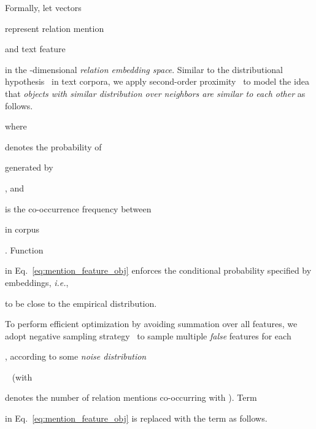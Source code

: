 \documentclass[letterpaper]{sig-alternate-2013}
\def\ie{{\sl i.e.}}
\begin{document}
Formally, let vectors \begin{small}\end{small} represent relation mention \begin{small}\end{small} and text feature \begin{small}\end{small} in the -dimensional \textit{relation embedding space}. Similar to the distributional hypothesis~\cite{mikolov2013distributed} in text corpora, we apply second-order proximity~\cite{tang2015line} to model the idea that \textit{objects with similar distribution over neighbors are similar to each other} as follows.

where \begin{small}\end{small} denotes the probability of \begin{small}\end{small} generated by \begin{small}\end{small}, and \begin{small}\end{small} is the co-occurrence frequency between \begin{small}\end{small} in corpus \begin{small}\end{small}. Function \begin{small}\end{small} in Eq.~\eqref{eq:mention_feature_obj} enforces the conditional probability specified by embeddings, \ie, \begin{small}\end{small} to be close to the empirical distribution.

To perform efficient optimization by avoiding summation over all features, we adopt negative sampling strategy~\cite{mikolov2013distributed} to sample multiple \textit{false} features for each \begin{small}\end{small}, according to some \textit{noise distribution} \begin{small}\end{small}~\cite{mikolov2013distributed} (with \begin{small}\end{small} denotes the number of relation mentions co-occurring with ). Term \begin{small}\end{small} in Eq.~\eqref{eq:mention_feature_obj} is replaced with the term as follows.
\end{document}
